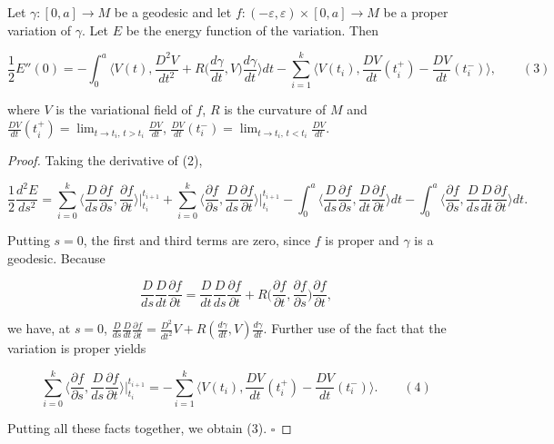 \begin{proposition}
  \label{prop:dc-ch9-2-8}
  Let $\gamma:[0,a]\to M$ be a geodesic and let
  $f:(-\varepsilon,\varepsilon)\times[0,a]\to M$ be a proper variation of $\gamma$. Let $E$
  be the energy function of the variation. Then
  
  $$
  \frac{1}{2}E''(0)=-\int_0^a\Big\langle V(t),\frac{D^2 V}{dt^2}+R\Big(\frac{d\gamma}{dt},V\Big)\frac{d\gamma}{dt}\Big\rangle dt-\sum_{i=1}^k\Big\langle V(t_i),\frac{DV}{dt}(t_i^+)-\frac{DV}{dt}(t_i^-)\Big\rangle,\qquad(3)
  $$
  
  where $V$ is the variational field of $f$, $R$ is the curvature of $M$ and
  $\frac{DV}{dt}(t_i^+)=\lim_{t\to t_i,\,t>t_i}\frac{DV}{dt}$,
  $\frac{DV}{dt}(t_i^-)=\lim_{t\to t_i,\,t<t_i}\frac{DV}{dt}$.
\end{proposition}
\begin{proof}
  Taking the derivative of (2),
  
  $$
  \frac{1}{2}\frac{d^2 E}{ds^2}=\sum_{i=0}^k\Big\langle\frac{D}{ds}\frac{\partial f}{\partial s},\frac{\partial f}{\partial t}\Big\rangle\Big|_{t_i}^{t_{i+1}}+\sum_{i=0}^k\Big\langle\frac{\partial f}{\partial s},\frac{D}{ds}\frac{\partial f}{\partial t}\Big\rangle\Big|_{t_i}^{t_{i+1}}-\int_0^a\Big\langle\frac{D}{ds}\frac{\partial f}{\partial s},\frac{D}{dt}\frac{\partial f}{\partial t}\Big\rangle dt-\int_0^a\Big\langle\frac{\partial f}{\partial s},\frac{D}{ds}\frac{D}{dt}\frac{\partial f}{\partial t}\Big\rangle dt.
  $$
  
  Putting $s=0$, the first and third terms are zero, since $f$ is proper and
  $\gamma$ is a geodesic. Because
  
  $$
  \frac{D}{ds}\frac{D}{dt}\frac{\partial f}{\partial t}=\frac{D}{dt}\frac{D}{ds}\frac{\partial f}{\partial t}+R\Big(\frac{\partial f}{\partial t},\frac{\partial f}{\partial s}\Big)\frac{\partial f}{\partial t},
  $$
  
  we have, at $s=0$,
  $\frac{D}{ds}\frac{D}{dt}\frac{\partial f}{\partial t}=\frac{D^2}{dt^2}V+R(\frac{d\gamma}{dt},V)\frac{d\gamma}{dt}$.
  Further use of the fact that the variation is proper yields
  
  $$
  \sum_{i=0}^k\Big\langle\frac{\partial f}{\partial s},\frac{D}{ds}\frac{\partial f}{\partial t}\Big\rangle\Big|_{t_i}^{t_{i+1}}=-\sum_{i=1}^k\Big\langle V(t_i),\frac{DV}{dt}(t_i^+)-\frac{DV}{dt}(t_i^-)\Big\rangle.\qquad(4)
  $$
  
  Putting all these facts together, we obtain (3). $\square$
\end{proof}


